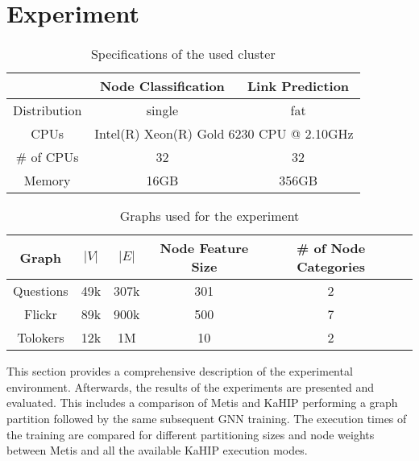 \documentclass[acmsmall,nonacm,screen,review]{acmart}
\begin{document}
\section{Experiment}
\begin{table}[bt!]
\centering
\begin{tabular}{ ccc }
 \centering
  & Node Classification & Link Prediction \\ 
 \hline
 Distribution & single & fat \\
 CPUs & \multicolumn{2}{c}{Intel(R) Xeon(R) Gold 6230 CPU @ 2.10GHz} \\ 
 \# of CPUs & 32 & 32 \\ 
 Memory & 16GB & 356GB \\
\end{tabular}
\caption{Specifications of the used cluster}
\label{hw}
\end{table}
\begin{table}[bt!]
\centering
\begin{tabular}{ cccccc }
 \centering
 Graph & $|V|$ & $|E|$ & Node Feature Size & \# of Node Categories \\ 
 \hline
 Questions \cite{TQ} & 49k & 307k & 301 & 2 \\ 
 Flickr \cite{Flickr} & 89k & 900k & 500 & 7\\ 
 Tolokers \cite{TQ,Tolokers} & 12k & 1M & 10 & 2 \\

\end{tabular}
\caption{Graphs used for the experiment}
\label{graphs}
\end{table}
This section provides a comprehensive description of the experimental environment. Afterwards, the results of the experiments are presented and evaluated. This includes a comparison of Metis and KaHIP performing a graph partition followed by the same subsequent GNN training. The execution times of the training are compared for different partitioning sizes and node weights between Metis and all the available KaHIP execution modes. 
\end{document}
